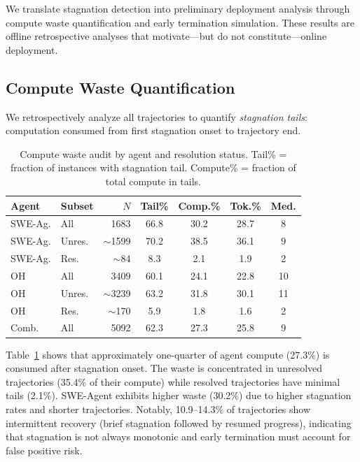 \documentclass[11pt,a4paper]{article}
\begin{document}
We translate stagnation detection into preliminary deployment analysis through compute waste quantification and early termination simulation. These results are offline retrospective analyses that motivate---but do not constitute---online deployment.

\subsection{Compute Waste Quantification}
\label{sec:waste}

We retrospectively analyze all trajectories to quantify \emph{stagnation tails}: computation consumed from first stagnation onset to trajectory end.

\begin{table}[t]
\centering
\small
\caption{Compute waste audit by agent and resolution status. Tail\% = fraction of instances with stagnation tail. Compute\% = fraction of total compute in tails.}
\label{tab:waste}
\begin{tabular}{llrcccc}
\toprule
\textbf{Agent} & \textbf{Subset} & \textbf{$N$} & \textbf{Tail\%} & \textbf{Comp.\%} & \textbf{Tok.\%} & \textbf{Med.} \\
\midrule
SWE-Ag. & All & 1683 & 66.8 & 30.2 & 28.7 & 8 \\
SWE-Ag. & Unres. & $\sim$1599 & 70.2 & 38.5 & 36.1 & 9 \\
SWE-Ag. & Res. & $\sim$84 & 8.3 & 2.1 & 1.9 & 2 \\
\midrule
OH & All & 3409 & 60.1 & 24.1 & 22.8 & 10 \\
OH & Unres. & $\sim$3239 & 63.2 & 31.8 & 30.1 & 11 \\
OH & Res. & $\sim$170 & 5.9 & 1.8 & 1.6 & 2 \\
\midrule
Comb. & All & 5092 & 62.3 & 27.3 & 25.8 & 9 \\
\bottomrule
\end{tabular}
\vspace{-2mm}
\end{table}

Table~\ref{tab:waste} shows that approximately one-quarter of agent compute (27.3\%) is consumed after stagnation onset. The waste is concentrated in unresolved trajectories (35.4\% of their compute) while resolved trajectories have minimal tails (2.1\%). SWE-Agent exhibits higher waste (30.2\%) due to higher stagnation rates and shorter trajectories. Notably, 10.9--14.3\% of trajectories show intermittent recovery (brief stagnation followed by resumed progress), indicating that stagnation is not always monotonic and early termination must account for false positive risk.
\end{document}
